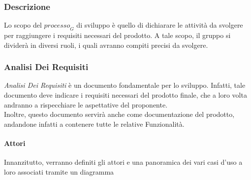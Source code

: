 \subsubsection{Descrizione}
Lo scopo del $\textit{processo}_G$ di sviluppo è quello di dichiarare le attività da svolgere per raggiungere i requisiti necessari del prodotto.
A tale scopo, il gruppo si dividerà in diversi ruoli, i quali avranno compiti precisi da svolgere.
\subsubsection{Analisi Dei Requisiti}
\textit{Analisi Dei Requisiti} è un documento fondamentale per lo sviluppo. Infatti, tale documento deve indicare i requisiti necessari del prodotto finale, che a loro volta andranno a rispecchiare le aspettative del proponente. \\
Inoltre, questo documento servirà anche come documentazione del prodotto, andandone infatti a contenere tutte le relative Funzionalità.
\paragraph{Attori} 
Innanzitutto, verranno definiti gli attori e una panoramica dei vari casi d'uso a loro associati tramite un diagramma
